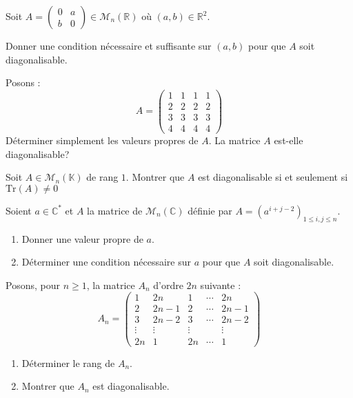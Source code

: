\documentclass[a4paper,10pt]{report}
\begin{document}
\begin{Exercice}{} Soit $A= \begin{pmatrix}
0 & a \\
b & 0
\end{pmatrix} \in \mathcal{M}_n(\mathbb{R})$ où $(a,b) \in \mathbb{R}^2$. 

Donner une condition nécessaire et suffisante sur $(a,b)$ pour que $A$ soit diagonalisable.
\end{Exercice}


\begin{Exercice}{} Posons :
    \[
    A =
    \begin{pmatrix}
      1 & 1 & 1 & 1 \\
      2 & 2 & 2 & 2 \\
      3 & 3 & 3 & 3 \\
      4 & 4 & 4 & 4
    \end{pmatrix}
    \]
Déterminer simplement les valeurs propres de $A$. La matrice $A$ est-elle diagonalisable?
\end{Exercice}



\begin{Exercice}{}\label{Rang} Soit $A \in \mathcal{M}_{n}(\mathbb{K})$ de rang $1$. Montrer que $A$ est diagonalisable si et seulement si $\textrm{Tr}(A) \neq 0$ \end{Exercice}


\begin{Exercice}{} Soient $a \in \mathbb{C}^*$ et $A$ la matrice de $\mathcal{M}_n(\mathbb{C})$ définie par $A=( a^{i+j-2})_{1 \leq i,j \leq n}$.

\begin{enumerate}
\item Donner une valeur propre de $a$.
\item Déterminer une condition nécessaire sur $a$ pour que $A$ soit diagonalisable.
\end{enumerate}
\end{Exercice}



\begin{Exercice}{} Posons, pour $n \geq 1$, la matrice $A_n$ d'ordre $2n$ suivante :
$$ A_n = \begin{pmatrix}
1 & 2n & 1 & \cdots & 2n \\
2 & 2n-1 & 2 & \cdots & 2n-1 \\
3 & 2n-2 & 3 & \cdots & 2n-2 \\
\vdots & \vdots & \vdots &  & \vdots \\
2n & 1 & 2n & \cdots & 1
\end{pmatrix}$$

\begin{enumerate}
\item Déterminer le rang de $A_n$.
\item Montrer que $A_n$ est diagonalisable.
\end{enumerate}
\end{Exercice}
\end{document}
